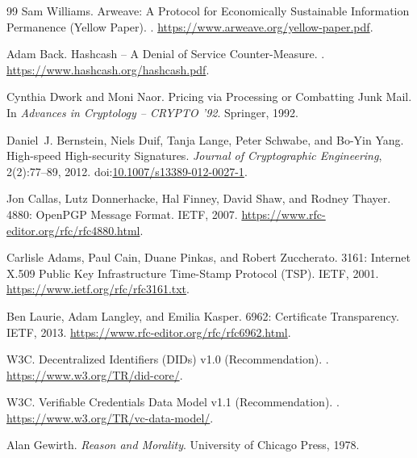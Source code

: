 \documentclass[11pt]{article}
\begin{document}
\begin{thebibliography}{99}
Sam Williams.
\newblock Arweave: A Protocol for Economically Sustainable Information
  Permanence (Yellow Paper).
.
\newblock \url{https://www.arweave.org/yellow-paper.pdf}.

Adam Back.
\newblock Hashcash -- A Denial of Service Counter-Measure.
.
\newblock \url{https://www.hashcash.org/hashcash.pdf}.

Cynthia Dwork and Moni Naor.
\newblock Pricing via Processing or Combatting Junk Mail.
\newblock In \emph{Advances in Cryptology -- {CRYPTO} '92}. Springer, 1992.

Daniel~J. Bernstein, Niels Duif, Tanja Lange, Peter Schwabe, and Bo-Yin Yang.
\newblock High-speed High-security Signatures.
\newblock \emph{Journal of Cryptographic Engineering}, 2(2):77--89, 2012.
\newblock doi:\href{https://doi.org/10.1007/s13389-012-0027-1}{10.1007/s13389-012-0027-1}.

Jon Callas, Lutz Donnerhacke, Hal Finney, David Shaw, and Rodney Thayer.
 4880: OpenPGP Message Format.
\newblock IETF, 2007.
\newblock \url{https://www.rfc-editor.org/rfc/rfc4880.html}.

Carlisle Adams, Paul Cain, Duane Pinkas, and Robert Zuccherato.
 3161: Internet X.509 Public Key Infrastructure Time-Stamp
  Protocol ({TSP}).
\newblock IETF, 2001.
\newblock \url{https://www.ietf.org/rfc/rfc3161.txt}.

Ben Laurie, Adam Langley, and Emilia Kasper.
 6962: Certificate Transparency.
\newblock IETF, 2013.
\newblock \url{https://www.rfc-editor.org/rfc/rfc6962.html}.

W3C.
\newblock Decentralized Identifiers ({DIDs}) v1.0 (Recommendation).
.
\newblock \url{https://www.w3.org/TR/did-core/}.

W3C.
\newblock Verifiable Credentials Data Model v1.1 (Recommendation).
.
\newblock \url{https://www.w3.org/TR/vc-data-model/}.

Alan Gewirth.
\newblock \emph{Reason and Morality}.
\newblock University of Chicago Press, 1978.


\end{thebibliography}
\end{document}
